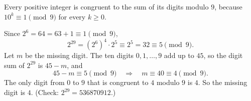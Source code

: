 Every positive integer is congruent to the sum of its digits modulo $9$, because $10^k\equiv1\pmod9$ for every $k\ge0$.

Since $2^6=64=63+1\equiv1\pmod9$,
\[
2^{29}=\left(2^6\right)^4\cdot2^5\equiv2^5=32\equiv5\pmod9 .
\]
Let $m$ be the missing digit. The ten digits $0,1,\dots,9$ add up to $45$, so the digit sum of $2^{29}$ is $45-m$, and
\[
45-m\equiv5\pmod9\quad\Longrightarrow\quad m\equiv40\equiv4\pmod9 .
\]
The only digit from $0$ to $9$ that is congruent to $4$ modulo $9$ is $4$. So the missing digit is $\boxed{4}$. (Check: $2^{29}=536870912$.)
